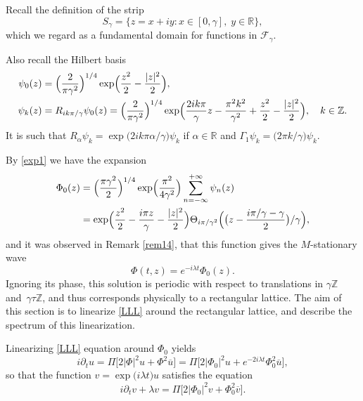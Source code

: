 \documentclass[JEP,XML,SOM,Unicode,NoFloatCountersInSection,published]{cedram}
\let\sep:
\theoremstyle{definition}
\let\EE\exp
\let\ov\overline
\newcommand\R{\mathbb R}
\newcommand{\bpac}[1]{\bigl[#1\bigr]}
\begin{document}
Recall the definition of the strip
\[
S_{\gamma}=\bigl\{z=x+iy\sep x\in[0,\gamma],\; y\in \R\bigr\},
\]
which we regard as a fundamental domain for functions in $\mathcal{F}_\gamma$.

Also recall the Hilbert basis
\begin{align*}
\psi_0(z)&=\Bigl(\frac{2}{\pi \gamma^2}\Bigr)^{1/4}\EE\Bigl(\frac{z^2}2-\frac{|z|^2}2\Bigr),\\
\psi_k(z)&=R_{{ik\pi}/{\gamma}}\psi_0(z)=\Bigl(\frac{2}{\pi \gamma^2}\Bigr)^{1/4}\EE\Bigl(\frac{2ik\pi} {\gamma} z -\frac{\pi^2k^2}{\gamma^2}+\frac{z^2}{2}-\frac{|z|^2}2\Bigr), \quad k \in \mathbb{Z}.
\end{align*}
It is such that $R_{\alpha}\psi_k=\EE\bigl({{2ik\pi \alpha}/ {\gamma}}\bigr) \psi_k$ if $\alpha \in \mathbb{R}$ and $\Gamma_1 \psi_k=\bigl({2 \pi k}/{\gamma} \bigr)\psi_k$.

By \eqref{exp1} we have the expansion
\begin{align*}
\Phi_0(z)&= \Bigl(\frac{\pi \gamma^2}{2}\Bigr)^{1/4} \EE\Bigl(\frac {\pi^2}{4\gamma^2}\Bigr) \sum_{n=-\infty}^{+\infty} \psi_n (z)\\
&=\EE\Bigl(\frac{z^2}2 -\frac{i\pi z} {\gamma} - \frac{|z|^2}2\Bigr) \Theta_{{i\pi}/{\gamma^2}}\Bigl({ \bigl({z-\frac{{i\pi}/{\gamma}-\gamma}2}}\bigr)/\gamma\Bigr),
\end{align*}
and it was observed in Remark \ref{rem14}, that this function gives the $M$-stationary wave
\[
\Phi(t,z) = e^{-i\lambda t}\Phi_0(z).
\]
Ignoring its phase, this solution is periodic with respect to translations in $\gamma \mathbb{Z}$ and~$\gamma \tau \mathbb{Z}$, and thus corresponds physically to a rectangular lattice.
The aim of this section is to linearize \eqref{LLL} around the rectangular lattice, and describe the spectrum of this linearization.

Linearizing \eqref{LLL} equation around $\Phi_0$ yields
\begin{equation}
i\partial_t u = \Pi\big[2|\Phi|^2u+\Phi^2\ov{u}\big] = \Pi\bpac{2|\Phi_0|^2u+e^{-2i\lambda t}\Phi_0^2\ov{u}},
\end{equation}
so that the function $v = \EE\bigl({i\lambda t}\bigr)u$ satisfies the equation
\begin{equation}\label{Lin_LLL}
i\partial_t v + \lambda v = \Pi\bpac{2|\Phi_0|^2v+\Phi_0^2\ov{v}}.
\end{equation}
\end{document}
